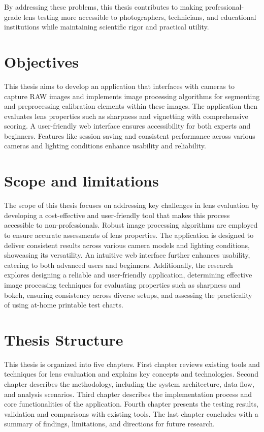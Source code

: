 By addressing these problems, this thesis contributes to making professional-grade lens testing more accessible to photographers, technicians, and educational institutions while maintaining scientific rigor and practical utility.

\section*{Objectives}
This thesis aims to develop an application that interfaces with cameras to capture RAW images and implements image processing algorithms for segmenting and preprocessing calibration elements within these images. The application then evaluates lens properties such as sharpness and vignetting with comprehensive scoring. A user-friendly web interface ensures accessibility for both experts and beginners. Features like session saving and consistent performance across various cameras and lighting conditions enhance usability and reliability.

\section*{Scope and limitations}

The scope of this thesis focuses on addressing key challenges in lens evaluation by developing a cost-effective and user-friendly tool that makes this process accessible to non-professionals. Robust image processing algorithms are employed to ensure accurate assessments of lens properties. The application is designed to deliver consistent results across various camera models and lighting conditions, showcasing its versatility. An intuitive web interface further enhances usability, catering to both advanced users and beginners. Additionally, the research explores designing a reliable and user-friendly application, determining effective image processing techniques for evaluating properties such as sharpness and bokeh, ensuring consistency across diverse setups, and assessing the practicality of using at-home printable test charts.

\section*{Thesis Structure}
This thesis is organized into five chapters. First chapter reviews existing tools and techniques for lens evaluation and explains key concepts and technologies. Second chapter describes the methodology, including the system architecture, data flow, and analysis scenarios. Third chapter describes the implementation process and core functionalities of the application. Fourth chapter presents the testing results, validation and comparisons with existing tools. The last chapter concludes with a summary of findings, limitations, and directions for future research.

